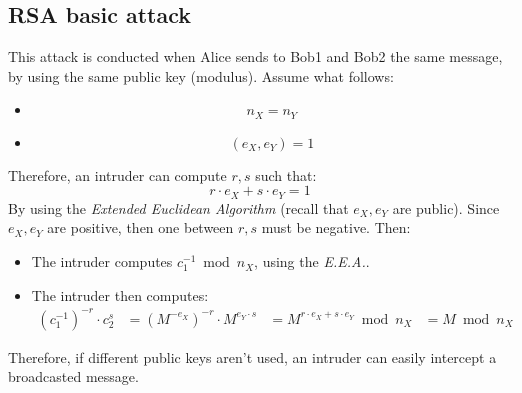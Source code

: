 \subsection{RSA basic attack}
This attack is conducted when Alice sends to Bob1 and Bob2 the same message, by using the same public key (modulus). Assume what follows:
\begin{itemize}
    \item \[n_{X} = n_{Y}\]
    \item \[(e_{X}, e_{Y}) = 1\]
\end{itemize}
Therefore, an intruder can compute $r,s$ such that:
\[r \cdot e_{X} + s \cdot e_{Y} = 1\]
By using the \emph{Extended Euclidean Algorithm} (recall that $e_{X}, e_{Y}$ are public). Since $e_{X}, e_{Y}$ are positive, then one between $r, s$ must be negative. Then:
\begin{itemize}
    \item The intruder computes $c_{1}^{-1} \bmod n_{X}$, using the \emph{E.E.A.}.
    \item The intruder then computes:
    \begin{align*}
        (c_{1}^{-1})^{-r} \cdot c_{2}^{s} & =
        (M^{-e_{X}})^{-r} \cdot M^{e_{Y} \cdot s} & =
        M^{r \cdot e_{X} + s \cdot e_{Y}} \bmod n_{X} & =
        M \bmod n_{X}
    \end{align*}
\end{itemize}
Therefore, if different public keys aren't used, an intruder can easily intercept a broadcasted message.

